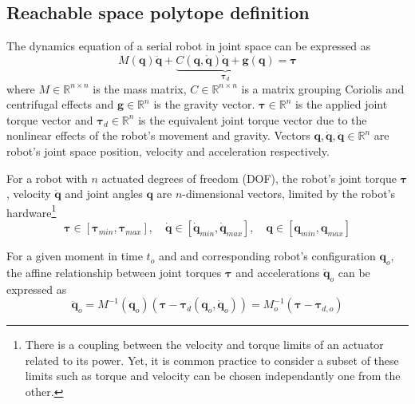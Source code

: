 \subsection{Reachable space polytope definition}
\label{ch:polytope}

The dynamics equation of a serial robot in joint space can be expressed as
\begin{equation}
    M(\bm{q})\ddot{\bm{q}} +\underbrace{ C(\bm{q},\dot{\bm{q}})\dot{\bm{q}} + \bm{g}(\bm{q}) }_{\bm{\tau}_d}= \bm{\tau}
    \label{eq:robot_model}
\end{equation}
where $M\in\mathbb{R}^{n\times n}$ is the mass matrix, $C\in\mathbb{R}^{n\times n}$ is a matrix grouping Coriolis and centrifugal effects and $\bm{g}\in\mathbb{R}^{n}$ is the gravity vector. $\bm{\tau}\in\mathbb{R}^{n}$ is the applied joint torque vector and $\bm{\tau}_d\in\mathbb{R}^{n}$ is the equivalent joint torque vector due to the nonlinear effects of the robot's movement and gravity. Vectors $\bm{q},\dot{\bm{q}},\ddot{\bm{q}}\in\mathbb{R}^n$ are robot's joint space position, velocity and acceleration respectively.

For a robot with $n$ actuated degrees of freedom (DOF), the robot's joint torque $\bm{\tau}$, velocity $\dot{\bm{q}}$ and joint angles $\bm{q}$ are $n$-dimensional vectors, limited by the robot's hardware\footnote{There is a coupling between the velocity and torque limits of an actuator related to its power. Yet, it is common practice to consider a subset of these limits such as torque and velocity can be chosen independantly one from the other.}
\begin{equation}
 \bm{\tau}\in\left[\bm{\tau}_{min},\bm{\tau}_{max}\right], \quad 
 \dot{\bm{q}}\in\left[\dot{\bm{q}}_{min},\dot{\bm{q}}_{max}\right], \quad \bm{q}\in\left[\bm{q}_{min},\bm{q}_{max}\right]
 \label{eq:limits}
\end{equation}


For a given moment in time $t_o$ and and corresponding robot's configuration $\bm{q}_o$, the affine relationship between joint torques $\bm{\tau}$ and accelerations $\ddot{\bm{q}}_{o}$ can be expressed as
\begin{equation}
    \ddot{\bm{q}}_{o} = M^{-1}(\bm{q}_o)(\bm{\tau} - \bm{\tau}_d(\bm{q}_o,\dot{\bm{q}}_o)) = M_o^{-1}(\bm{\tau} - \bm{\tau}_{d,o})
\end{equation}

